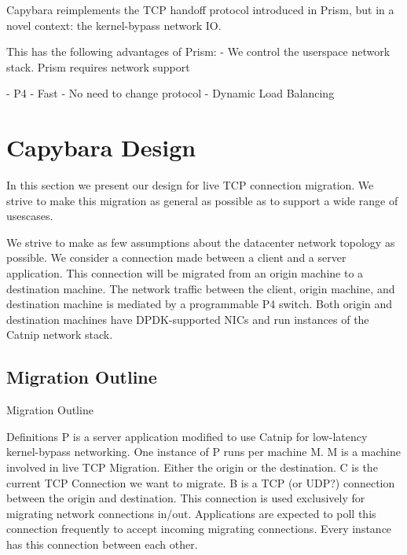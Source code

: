 Capybara reimplements the TCP handoff protocol introduced in Prism, but in a novel context: the kernel-bypass network IO.

This has the following advantages of Prism:
- We control the userspace network stack. Prism requires network support 

- P4
- Fast
- No need to change protocol
- Dynamic Load Balancing

\section{Capybara Design}
In this section we present our design for live TCP connection migration. We strive to make this migration as general as possible as to support a wide range of usescases.

We strive to make as few assumptions about the datacenter network topology as possible. We consider a connection made between a client and a server application. This connection will be migrated from an origin machine to a destination machine. The network traffic between the client, origin machine, and destination machine is mediated by a programmable P4 switch. Both origin and destination machines have DPDK-supported NICs and run instances of the Catnip network stack.

\subsection{Migration Outline}
Migration Outline

Definitions
P is a server application modified to use Catnip for low-latency kernel-bypass networking. One instance of P runs per machine M.
M is a machine involved in live TCP Migration. Either the origin or the destination.
C is the current TCP Connection we want to migrate.
B is a TCP (or UDP?) connection between the origin and destination. This connection is used exclusively for migrating network connections in/out. Applications are expected to poll this connection frequently to accept incoming migrating connections. Every instance has this connection between each other.

